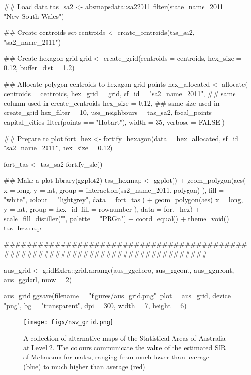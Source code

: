 \begin{Schunk}
\begin{Sinput}
## Load data
tas_sa2 <- absmapsdata::sa22011 %
  filter(state_name_2011 == "New South Wales")

## Create centroids set
centroids <- create_centroids(tas_sa2, "sa2_name_2011")

## Create hexagon grid
grid <- create_grid(centroids = centroids,
                    hex_size = 0.12,
                    buffer_dist = 1.2)

## Allocate polygon centroids to hexagon grid points
hex_allocated <- allocate(
  centroids = centroids,
  hex_grid = grid,
  sf_id = "sa2_name_2011",
  ## same column used in create_centroids
  hex_size = 0.12,
  ## same size used in create_grid
  hex_filter = 10,
  use_neighbours = tas_sa2,
  focal_points = capital_cities %
    filter(points == "Hobart"),
  width = 35,
  verbose = FALSE
)

## Prepare to plot
fort_hex <- fortify_hexagon(data = hex_allocated,
                            sf_id = "sa2_name_2011",
                            hex_size = 0.12)

fort_tas <- tas_sa2 %
  fortify_sfc()

## Make a plot
library(ggplot2)
tas_hexmap <- ggplot() +
  geom_polygon(aes(
      x = long,
      y = lat,
      group = interaction(sa2_name_2011, polygon)
    ),
    fill = "white",
    colour = "lightgrey",
    data = fort_tas
  ) +
  geom_polygon(aes(
    x = long,
    y = lat,
    group = hex_id,
    fill = rownumber
  ),
  data = fort_hex) +
  scale_fill_distiller("", palette = "PRGn") +
  coord_equal() + theme_void()
tas_hexmap
\end{Sinput}
\end{Schunk}

\begin{Schunk}
\begin{Sinput}
###############################################################################

aus_grid <- gridExtra::grid.arrange(aus_ggchoro, aus_ggcont, aus_ggncont, aus_ggdorl, nrow = 2)

aus_grid
ggsave(filename = "figures/aus_grid.png", plot = aus_grid,
  device = "png", bg = "transparent", dpi = 300,  width = 7, height = 6)
\end{Sinput}
\end{Schunk}

\begin{figure}[h]
\centering
\texttt{[image: figs/nsw\_grid.png]}
\caption{\label{fig:nsw_grid}A collection of alternative maps of the Statistical Areas of Australia at Level 2. The colours communicate the value of the estimated SIR of Melanoma for males, ranging from much lower than average (blue) to much higher than average (red)}
\end{figure}

